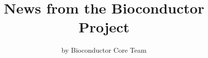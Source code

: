 \title{News from the Bioconductor Project}
\author{by Bioconductor Core Team}

\maketitle

\begin{verbatim}
\end{verbatim}


\address{%
Bioconductor Core Team\\
\\%
\\
%
%
%
%
}
